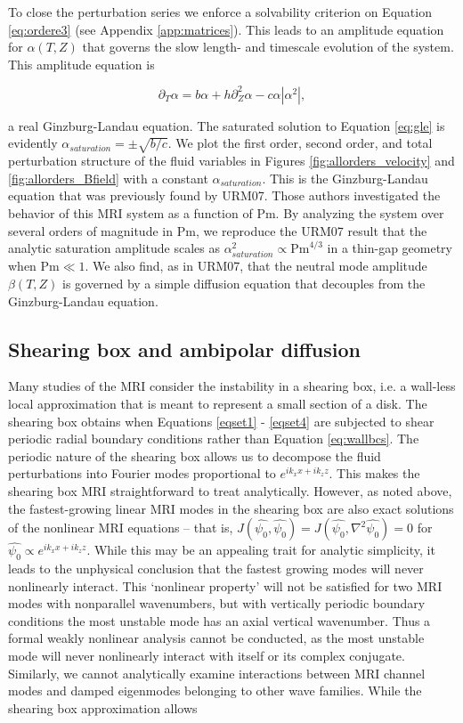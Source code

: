 \documentclass{emulateapj}
\newcommand{\beq}{\begin{equation}}
\newcommand{\eeq}{\end{equation}}
\newcommand{\Pm}{\mathrm{Pm}}
\begin{document}
To close the perturbation series we enforce a solvability criterion on Equation \ref{eq:ordere3} (see Appendix \ref{app:matrices}). This leads to an amplitude equation for $\alpha(T, Z)$ that governs the slow length- and timescale evolution of the system. This amplitude equation is 

\beq
\label{eq:gle}
\partial_T \alpha = b \alpha + h \partial_Z^2 \alpha - c \alpha \left|\alpha^2\right|,
\eeq

a real Ginzburg-Landau equation. The saturated solution to Equation \ref{eq:gle} is evidently $\alpha_{saturation} = \pm \sqrt{b/c}$. We plot the first order, second order, and total perturbation structure of the fluid variables in Figures \ref{fig:allorders_velocity} and \ref{fig:allorders_Bfield} with a constant $\alpha_{saturation}$. This is the Ginzburg-Landau equation that was previously found by URM07. Those authors investigated the behavior of this MRI system as a function of $\Pm$. By analyzing the system over several orders of magnitude in $\Pm$, we reproduce the URM07 result that the analytic saturation amplitude scales as $\alpha_{saturation}^2 \propto \Pm^{4/3}$ in a thin-gap geometry when $\Pm \ll 1$. We also find, as in URM07, that the neutral mode amplitude $\beta(T, Z)$ is governed by a simple diffusion equation that decouples from the Ginzburg-Landau equation.

\subsection{\textbf{Shearing box and ambipolar diffusion}}

Many studies of the MRI consider the instability in a shearing box, i.e. a wall-less local approximation that is meant to represent a small section of a disk. The shearing box obtains when Equations \ref{eqset1} - \ref{eqset4} are subjected to shear periodic radial boundary conditions rather than Equation \ref{eq:wallbcs}. The periodic nature of the shearing box allows us to decompose the fluid perturbations into Fourier modes proportional to $e^{i k_x x + i k_z z}$. This makes the shearing box MRI straightforward to treat analytically. However, as noted above, the fastest-growing linear MRI modes in the shearing box are also exact solutions of the nonlinear MRI equations -- that is, $J(\hat{\psi_0}, \hat{\psi_0}) = J(\hat{\psi_0}, \nabla^2 \hat{\psi_0}) = 0$ for $\hat{\psi_0} \propto e^{i k_x x + i k_z z}$. While this may be an appealing trait for analytic simplicity, it leads to the unphysical conclusion that the fastest growing modes will never nonlinearly interact. This `nonlinear property' will not be satisfied for two MRI modes with nonparallel wavenumbers, but with vertically periodic boundary conditions the most unstable mode has an axial vertical wavenumber. Thus a formal weakly nonlinear analysis cannot be conducted, as the most unstable mode will never nonlinearly interact with itself or its complex conjugate. Similarly, we cannot analytically examine interactions between MRI channel modes and damped eigenmodes belonging to other wave families. While the shearing box approximation allows 
\end{document}
